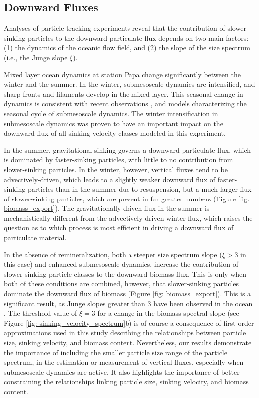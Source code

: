 \documentclass[article,linenumbers]{agujournal2018}
\begin{document}
\subsection{Downward Fluxes}
\label{sec: discussion_particle}

Analyses of particle tracking experiments reveal that the contribution of slower-sinking particles to the downward particulate flux depends on two main factors: (1) the dynamics of the oceanic flow field, and (2) the slope of the size spectrum (i.e., the Junge slope $\xi$).

Mixed layer ocean dynamics at station Papa change significantly between the winter and the summer. In the winter, submesoscale dynamics are intensified, and sharp fronts and filaments develop in the mixed layer. This seasonal change in dynamics is consistent with recent observations \citep{Thompson_2016, Buckingham_2016}, and models \citep{Brannigan_2015, Callies_2015, Rocha_2016} characterizing the seasonal cycle of submesoscale dynamics. The winter intensification in submesoscale dynamics was proven to have an important impact on the downward flux of all sinking-velocity classes modeled in this experiment.

In the summer,  gravitational sinking governs a downward particulate flux, which is dominated by faster-sinking particles, with little to no contribution from slower-sinking particles. In the winter, however, vertical fluxes tend to be advectively-driven, which leads to a slightly weaker downward flux of faster-sinking particles than in the summer due to resuspension, but a much larger flux of slower-sinking particles, which are present in far greater numbers (Figure \ref{fig: biomass_export}). The gravitationally-driven flux in the summer is mechanistically different from the advectively-driven winter flux, which raises the question as to which process is most efficient in driving a downward flux of particulate material.

In the absence of remineralization, both a steeper size spectrum slope ($\xi>3$ in this case) and enhanced submesoscale dynamics, increase the contribution of slower-sinking particle classes to the downward biomass flux. This is only when both of these conditions are combined, however, that slower-sinking particles dominate the downward flux of biomass (Figure \ref{fig: biomass_export}). This is a significant result, as Junge slopes greater than 3 have been observed in the ocean \citep{Kostadinov_2009, White_2015}. The threshold value of $\xi =3$ for a change in the biomass spectral slope (see Figure \ref{fig: sinking_velocity_spectrum}b) is of course a consequence of first-order approximations used in this study describing the relationships between particle size, sinking velocity, and biomass content. Nevertheless, our results demonstrate the importance of including the smaller particle size range of the particle spectrum,  in the estimation or measurement of vertical fluxes, especially when submesoscale dynamics are active. It also highlights the importance of better constraining the relationships linking particle size, sinking velocity, and biomass content.
\end{document}
